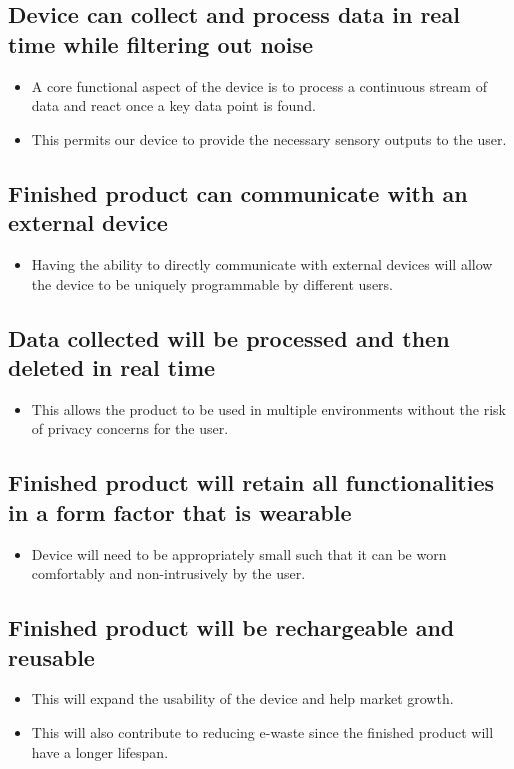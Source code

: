 \documentclass{article}
\begin{document}
 \subsection{Device can collect and process data in real time
 while filtering out noise }  
 \begin{itemize}
    \item A core functional aspect of the device is to process a continuous stream of data and react once a key data point is found.
    \item This permits our device to provide the necessary sensory outputs to the user.
  \end{itemize} 

 \subsection{Finished product can communicate with an
 external device}
 \begin{itemize}
    \item Having the ability to directly communicate with external devices will allow the device to be uniquely programmable by different users.
 \end{itemize}

 \subsection{Data collected will be processed and then
 deleted in real time}
 \begin{itemize}
    \item This allows the product to be used in multiple environments without the risk of privacy concerns for the user.
\end{itemize}  

 \subsection{Finished product will retain all functionalities
 in a form factor that is wearable}
 \begin{itemize}
    \item Device will need to be appropriately small such that it can be worn comfortably and non-intrusively by the user.
 \end{itemize}

 \subsection{Finished product will be rechargeable and
 reusable}
 \begin{itemize}
    \item This will expand the usability of the device and help market growth.
    \item This will also contribute to reducing e-waste since the finished product will have a longer lifespan.
 \end{itemize} 
\end{document}
